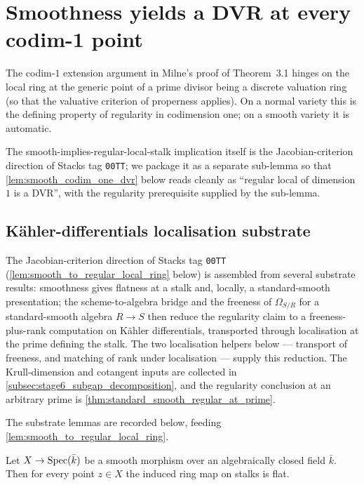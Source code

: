 \section{Smoothness yields a DVR at every codim-1 point}
\label{sec:smooth_dvr}

The codim-\(1\) extension argument in Milne's proof of Theorem~3.1 hinges on the local
ring at the generic point of a prime divisor being a discrete valuation ring (so that
the valuative criterion of properness applies). On a normal variety this is the
defining property of regularity in codimension one; on a smooth variety it is automatic.

The smooth-implies-regular-local-stalk implication itself is the Jacobian-criterion
direction of Stacks tag \texttt{00TT}; we package it as a separate sub-lemma so that
\cref{lem:smooth_codim_one_dvr} below reads cleanly as ``regular local of dimension
\(1\) is a DVR'', with the regularity prerequisite supplied by the sub-lemma.

\subsection{K\"ahler-differentials localisation substrate}
\label{subsec:kaehler_localisation_substrate}

The Jacobian-criterion direction of Stacks tag \texttt{00TT}
(\cref{lem:smooth_to_regular_local_ring} below) is assembled from several
substrate results: smoothness gives flatness at a stalk and, locally, a
standard-smooth presentation; the scheme-to-algebra bridge and the freeness of
\(\Omega_{S/R}\) for a standard-smooth algebra \(R \to S\) then reduce the
regularity claim to a freeness-plus-rank computation on K\"ahler differentials,
transported through localisation at the prime defining the stalk. The two
localisation helpers below --- transport of freeness, and matching of rank under
localisation --- supply this reduction. The Krull-dimension and cotangent inputs
are collected in \cref{subsec:stage6_subgap_decomposition}, and the regularity
conclusion at an arbitrary prime is \cref{thm:standard_smooth_regular_at_prime}.

The substrate lemmas are recorded below, feeding
\cref{lem:smooth_to_regular_local_ring}.

\begin{lemma}
  \label{lem:stalkMap_flat_of_smooth}
  Let \(X \to \operatorname{Spec}(\bar k)\) be a smooth morphism over an algebraically closed
  field \(\bar k\). Then for every point \(z \in X\) the induced ring map on
  stalks is flat.
\end{lemma}


